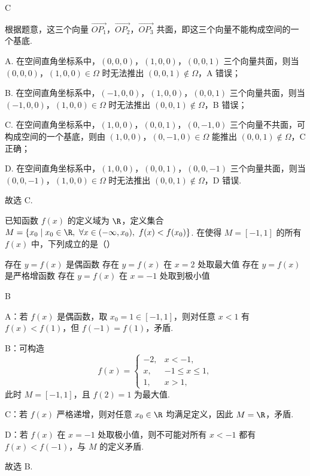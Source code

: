 \begin{answer}
C
\end{answer}

\begin{solution}
根据题意，这三个向量 \(\overrightarrow{OP_1}\)，\(\overrightarrow{OP_2}\)，\(\overrightarrow{OP_3}\) 共面，即这三个向量不能构成空间的一个基底.

A. 在空间直角坐标系中，\((0,0,0)\)，\((1,0,0)\)，\((0,0,1)\) 三个向量共面，则当 \((0,0,0)\)，\((1,0,0)\in \Omega\) 时无法推出 \((0,0,1)\notin \Omega\)，A 错误；

B. 在空间直角坐标系中，\((-1,0,0)\)，\((1,0,0)\)，\((0,0,1)\) 三个向量共面，则当 \((-1,0,0)\)，\((1,0,0)\in \Omega\) 时无法推出 \((0,0,1)\notin \Omega\)，B 错误；

C. 在空间直角坐标系中，\((1,0,0)\)，\((0,0,1)\)，\((0,-1,0)\) 三个向量不共面，可构成空间的一个基底，则由 \((1,0,0)\)，\((0,-1,0)\in \Omega\) 能推出 \((0,0,1)\notin \Omega\)，C 正确；

D. 在空间直角坐标系中，\((1,0,0)\)，\((0,0,1)\)，\((0,0,-1)\) 三个向量共面，则当 \((0,0,-1)\)，\((1,0,0)\in \Omega\) 时无法推出 \((0,0,1)\notin \Omega\)，D 错误.

故选 C.
\end{solution}

\begin{problem}
已知函数 \(f(x)\) 的定义域为 \(\R\)，定义集合 \(M=\{x_0\mid x_0\in \R,\ \forall x\in(-\infty,x_0),\ f(x)<f(x_0)\}\). 在使得 \(M=[-1,1]\) 的所有 \(f(x)\) 中，下列成立的是（\quad）

\choices
    {存在 \(y=f(x)\) 是偶函数}
    {存在 \(y=f(x)\) 在 \(x=2\) 处取最大值}
    {存在 \(y=f(x)\) 是严格增函数}
    {存在 \(y=f(x)\) 在 \(x=-1\) 处取到极小值}
\end{problem}

\begin{answer}
B
\end{answer}

\begin{solution}
A：若 \(f(x)\) 是偶函数，取 \(x_0=1\in[-1,1]\)，则对任意 \(x<1\) 有 \(f(x)<f(1)\)，但 \(f(-1)=f(1)\)，矛盾.

B：可构造
\[
f(x)=
\begin{cases}
-2, & x<-1,\\
x, & -1\le x\le 1,\\
1, & x>1,
\end{cases}
\]
此时 \(M=[-1,1]\)，且 \(f(2)=1\) 为最大值.

C：若 \(f(x)\) 严格递增，则对任意 \(x_0\in \R\) 均满足定义，因此 \(M=\R\)，矛盾.

D：若 \(f(x)\) 在 \(x=-1\) 处取极小值，则不可能对所有 \(x<-1\) 都有 \(f(x)<f(-1)\)，与 \(M\) 的定义矛盾.

故选 B.
\end{solution}
